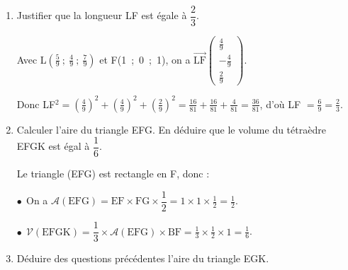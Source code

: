 \documentclass[10pt]{article}
\providecommand{\R}{\mathbb{R}}
\providecommand{\vect}[1]{\overrightarrow{#1}}
\begin{document}
\begin{enumerate}
L étant le projeté orthogonal de F sur le plan (EGK), L est un point de la droite $(d)$ et du plan (EGK) : ses coordonnées vérifient donc les équations de $(d)$ et du plan (EGK), donc le système :

$\left\{\begin{array}{l c l}
x &=& 1 + 2t\\
y &=&\phantom{1}- 2t\\
z &=&1 + t\\
2x - 2y + z&=&1
\end{array}\right., t \in \R$

En remplaçant $x$, \: $y$,\: et $z$ par leurs expressions en fonction de $t$ dans la dernière équation on obtient :

$2(1 + 2t) - 2\times (- 2t) + 1 + t = 1\iff 2 + 4t + 4t +t + 1 = 1\iff 9t = - 2\iff t = - \dfrac29$.
On a donc : $x = 1 + 2\times \left(- \dfrac29\right) = 1 - \dfrac{4}{9} = \dfrac{5}{9}$ ;

$y = - 2 \times \left(- \dfrac29\right)  = \dfrac49$ ;

$z = 1 - \dfrac29 = \dfrac79$.

Conclusion : L$\left(\dfrac59~;~\dfrac49~;~\dfrac79\right)$.
\item Justifier que la longueur LF est égale à $\dfrac23$.

Avec L$\left(\frac59~;~\frac49~;~\frac79\right)$ et F(1~;~0~;~1), on a $\vect{\text{LF}}\begin{pmatrix}\frac49\\-  \frac49\\\frac29 \end{pmatrix}$.

Donc LF$^2 = \left(\frac49\right)^2 + \left(\frac49\right)^2 + \left(\frac29\right)^2  = \frac{16}{81} + \frac{16}{81} + \frac{4}{81} = \frac{36}{81}$, d'où LF $= \frac69 = \frac23$.
\item Calculer l'aire du triangle EFG. En déduire que le volume du tétraèdre EFGK est égal à $\dfrac16$.

Le triangle (EFG) est rectangle en F, donc :

$\bullet~~$On a $\mathcal{A}(\text{EFG}) = \text{EF} \times \text{FG} \times \dfrac12 = 1 \times 1 \times \frac12 = \frac12$.

$\bullet~~$$\mathcal{V}(\text{EFGK}) = \dfrac13 \times \mathcal{A}(\text{EFG}) \times \text{BF} = \frac13 \times \frac12 \times 1 = \frac16$.
\item Déduire des questions précédentes l'aire du triangle EGK.


\end{enumerate}
\end{document}
